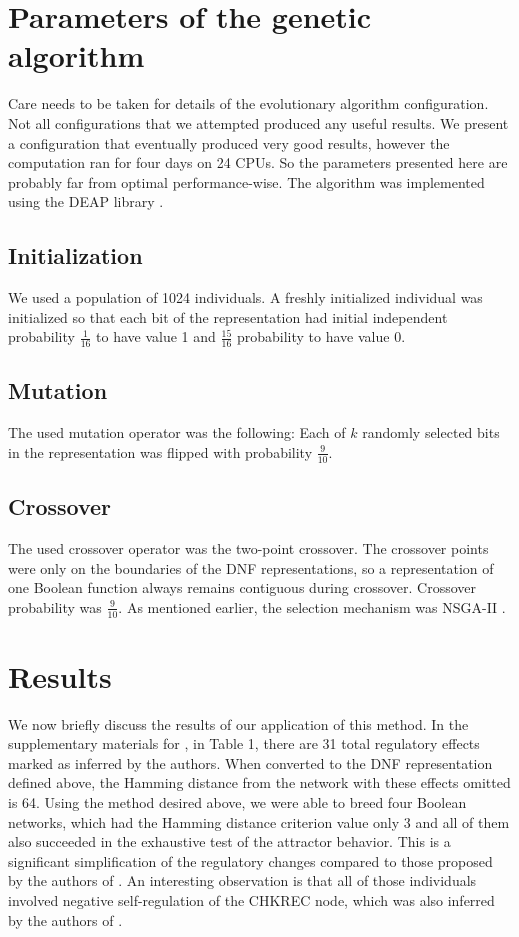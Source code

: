 \documentclass[a4paper,10pt]{article}
\begin{document}
\section{Parameters of the genetic algorithm}
Care needs to be taken for details of the evolutionary algorithm configuration.
Not all configurations that we attempted produced any useful results.
We present a configuration that eventually produced very good results,
however the computation ran for four days on 24 CPUs. So the parameters presented here
are probably far from optimal performance-wise. 
The algorithm was implemented using the DEAP library \cite{deap}.

\subsection{Initialization}
We used a population of 1024 individuals.
A freshly initialized individual was initialized so that each bit of the representation
had initial independent probability $\frac{1}{16}$ to have value 1 and $\frac{15}{16}$ probability to have value 0.

\subsection{Mutation}
The used mutation operator was the following: Each of $k$ randomly selected bits in the representation
was flipped with probability $\frac{9}{10}$.

\subsection{Crossover}
The used crossover operator was the two-point crossover.
The crossover points were only on the boundaries of the DNF representations,
so a representation of one Boolean function always remains contiguous during crossover.
Crossover probability was $\frac{9}{10}$.
As mentioned earlier, the selection mechanism was NSGA-II \cite{nsga2}.

\section{Results}
We now briefly discuss the results of our application of this method.
In the supplementary materials for \cite{rodriguez1}, in Table 1,
there are 31 total regulatory effects marked as inferred by the authors.
When converted to the DNF representation defined above, the Hamming distance
from the network with these effects omitted is 64. 
Using the method desired above, we were able to breed four Boolean networks,
which had the Hamming distance criterion value only 3 and all of them
also succeeded in the exhaustive test of the attractor behavior.
This is a significant simplification of the regulatory changes 
compared to those proposed by the authors of \cite{rodriguez1}.
An interesting observation is that all of those individuals involved
negative self-regulation of the CHKREC node, which was also inferred 
by the authors of \cite{rodriguez1}.
\end{document}
